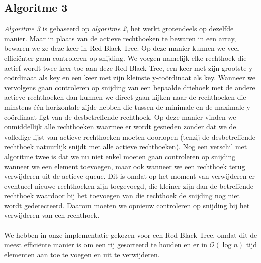 \documentclass[11pt,a4paper,titlepage]{article}
\begin{document}
	\subsection{Algoritme 3}
	\emph{Algoritme 3} is gebaseerd op \emph{algoritme 2}, het werkt grotendeels op dezelfde manier. Maar in plaats van de actieve rechthoeken te bewaren in een array, bewaren we ze deze keer in Red-Black Tree. Op deze manier kunnen we veel efficiënter gaan controleren op snijding. We voegen namelijk elke rechthoek die actief wordt twee keer toe aan deze Red-Black Tree, een keer met zijn grootste y-coördinaat als key en een keer met zijn kleinste y-coördinaat als key.  Wanneer we vervolgens gaan controleren op snijding van een bepaalde driehoek met de andere actieve rechthoeken dan kunnen we direct gaan kijken naar de rechthoeken die minstens één horizontale zijde hebben die tussen de minimale en de maximale y-coördinaat ligt van de desbetreffende rechthoek. Op deze manier vinden we onmiddellijk alle rechthoeken waarmee er wordt gesneden zonder dat we de volledige lijst van actieve rechthoeken moeten doorlopen (tenzij de desbetreffende rechthoek natuurlijk snijdt met alle actieve rechthoeken). Nog een verschil met algoritme twee is dat we nu niet enkel moeten gaan controleren op snijding wanneer we een element toevoegen, maar ook wanneer we een rechthoek terug verwijderen uit de actieve queue. Dit is omdat op het moment van verwijderen er eventueel nieuwe rechthoeken zijn toegevoegd, die kleiner zijn dan de betreffende rechthoek waardoor bij het toevoegen van die rechthoek de snijding nog niet wordt gedetecteerd.  Daarom moeten we opnieuw controleren op snijding bij het verwijderen van een rechthoek. \\ \\
	We hebben in onze implementatie gekozen voor een Red-Black Tree, omdat dit de meest efficiënte manier is om een rij gesorteerd te houden en er in  $\mathcal{O}(\log n)$ tijd elementen aan toe te voegen en uit te verwijderen.	
\end{document}
